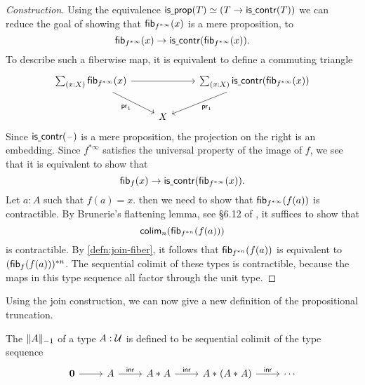 \begin{proof}[Construction]
Using the equivalence $\eqv{\isprop(T)}{(T\to\iscontr(T))}$ 
we can reduce the goal of showing that $\fib{f^{\ast\infty}}{x}$ is a mere proposition, to
\begin{equation*}
\fib{f^{\ast\infty}}{x}\to \iscontr (\fib{f^{\ast\infty}}{x}).
\end{equation*}
To describe such a fiberwise map, it is equivalent to define a commuting triangle
\begin{equation*}
\begin{tikzcd}
\sm{x:X}\fib{f^{\ast\infty}}{x} \arrow[rr] \arrow[dr,swap,"\proj 1"] & & \sm{x:X} \iscontr (\fib{f^{\ast\infty}}{x}) \arrow[dl,"\proj 1"] \\
& X
\end{tikzcd}
\end{equation*}
Since $\iscontr(\blank)$ is a mere proposition, the projection on the right is an embedding. Since $f^{\ast\infty}$ satisfies the universal property of the image of $f$, we see that it is equivalent to show that
\begin{equation*}
\fib{f}{x}\to \iscontr (\fib{f^{\ast\infty}}{x}).
\end{equation*}
Let $a:A$ such that $f(a)=x$. then we need to show that $\fib{f^{\ast\infty}}{f(a)}$ is contractible.
By Brunerie's flattening lemma, see \S 6.12 of \cite{hottbook}, it suffices to show that
\begin{equation*}
\tfcolim_n(\fib{f^{\ast n}}{f(a)})
\end{equation*}
is contractible. By \autoref{defn:join-fiber}, it follows that $\fib{f^{\ast n}}{f(a)}$ is equivalent
to $(\fib{f}{f(a)})^{\ast n}$. The sequential colimit of these types is contractible, because
the maps in this type sequence all factor through the unit type.
\end{proof}

Using the join construction, we can now give a new definition of the propositional truncation.

\begin{defn}\label{defn:proptrunc}
The  $\trunc{-1}{A}$ of a type $A:\UU$ is defined to be 
sequential colimit of the type sequence
\begin{equation*}
\begin{tikzcd}
\emptyt \arrow[r] & A \arrow[r,"\inr"] & \join{A}{A} \arrow[r,"\inr"] & \join{A}{(\join{A}{A})} \arrow[r,"\inr"] & \cdots
\end{tikzcd}\qedhere
\end{equation*}
\end{defn}

